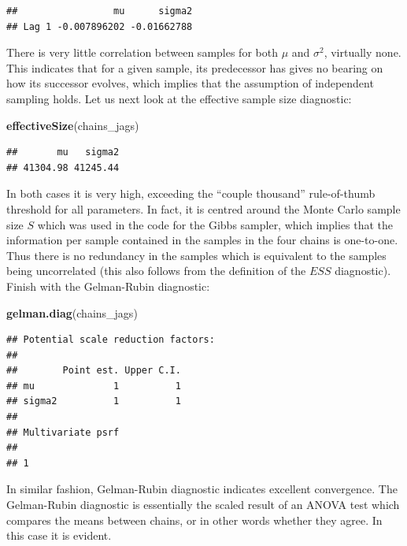 \documentclass[
]{homework}
\newenvironment{Shaded}{\begin{snugshade}}{\end{snugshade}}
\newcommand{\FunctionTok}[1]{\textcolor[rgb]{0.13,0.29,0.53}{\textbf{#1}}}
\newcommand{\NormalTok}[1]{#1}
\begin{document}
\begin{verbatim}
##                 mu      sigma2
## Lag 1 -0.007896202 -0.01662788
\end{verbatim}

There is very little correlation between samples for both \(\mu\) and \(\sigma^2\), virtually none. This indicates that for a given sample, its predecessor has gives no bearing on how its successor evolves,
which implies that the assumption of independent sampling holds. Let us next look at the effective sample size diagnostic:

\begin{Shaded}
\begin{Highlighting}[]
\FunctionTok{effectiveSize}\NormalTok{(chains\_jags)}
\end{Highlighting}
\end{Shaded}

\begin{verbatim}
##       mu   sigma2 
## 41304.98 41245.44
\end{verbatim}

In both cases it is very high, exceeding the ``couple thousand'' rule-of-thumb threshold for all parameters. In fact, it is centred around the Monte Carlo sample size \(S\) which
was used in the code for the Gibbs sampler, which implies that the information per sample contained in the samples in the four chains is one-to-one. Thus there is no redundancy
in the samples which is equivalent to the samples being uncorrelated (this also follows from the definition of the \(ESS\) diagnostic). Finish with the Gelman-Rubin diagnostic:

\begin{Shaded}
\begin{Highlighting}[]
\FunctionTok{gelman.diag}\NormalTok{(chains\_jags)}
\end{Highlighting}
\end{Shaded}

\begin{verbatim}
## Potential scale reduction factors:
## 
##        Point est. Upper C.I.
## mu              1          1
## sigma2          1          1
## 
## Multivariate psrf
## 
## 1
\end{verbatim}

In similar fashion, Gelman-Rubin diagnostic indicates excellent convergence. The Gelman-Rubin diagnostic is essentially the scaled result of an ANOVA test which compares the
means between chains, or in other words whether they agree. In this case it is evident.
\end{document}
